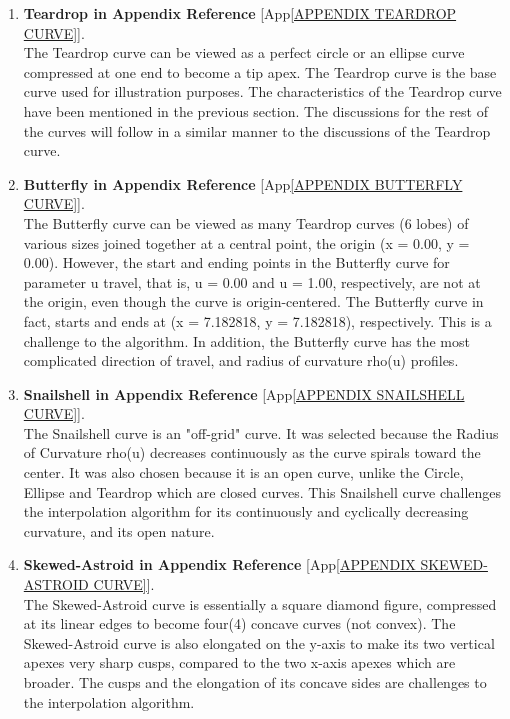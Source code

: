 \begin{enumerate}
	\item \textbf{Teardrop in Appendix Reference} [App\ref{APPENDIX TEARDROP CURVE}]. \\ 
	The Teardrop curve can be viewed as a perfect circle or an ellipse curve compressed at one end to become a tip apex. The Teardrop curve is the base curve used for illustration purposes. The characteristics of the Teardrop curve have been mentioned in the previous section. The discussions for the rest of the curves will follow in a similar manner to the discussions of the Teardrop curve.
	
	\item \textbf{Butterfly in Appendix Reference} [App\ref{APPENDIX BUTTERFLY CURVE}]. \\ 
    The Butterfly curve can be viewed as many Teardrop curves (6 lobes) of various sizes joined together at a central point, the origin (x = 0.00, y = 0.00). However, the start and ending points in the Butterfly curve for parameter u travel, that is, u = 0.00 and u = 1.00, respectively, are not at the origin, even though the curve is origin-centered. The Butterfly curve in fact, starts and ends at (x = 7.182818, y = 7.182818), respectively. This is a challenge to the algorithm. In addition, the Butterfly curve has the most complicated direction of travel, and radius of curvature rho(u) profiles.
	
	\item \textbf{Snailshell in Appendix Reference} [App\ref{APPENDIX SNAILSHELL CURVE}]. \\ 
    The Snailshell curve is an "off-grid" curve. It was selected because the Radius of Curvature rho(u) decreases  continuously as the curve spirals toward the center. It was also chosen because it is an open curve, unlike the Circle, Ellipse and Teardrop which are closed curves. This Snailshell curve challenges the interpolation algorithm for its continuously and cyclically decreasing curvature, and its open nature.  
	
	\item \textbf{Skewed-Astroid in Appendix Reference} [App\ref{APPENDIX SKEWED-ASTROID CURVE}]. \\ 
    The Skewed-Astroid curve is essentially a square diamond figure, compressed at its linear edges to become four(4) concave curves (not convex). The Skewed-Astroid curve is also elongated on the y-axis to make its two vertical apexes very sharp cusps, compared to the two x-axis apexes which are broader. The cusps and the elongation of its concave sides are challenges to the interpolation algorithm.
    

\end{enumerate}
